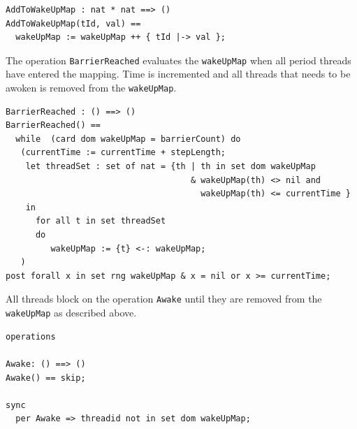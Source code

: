 \documentclass{overturerepchap}
\begin{document}
\begin{lstlisting}
AddToWakeUpMap : nat * nat ==> ()
AddToWakeUpMap(tId, val) ==
  wakeUpMap := wakeUpMap ++ { tId |-> val };
\end{lstlisting}

The operation \texttt{BarrierReached} evaluates the \texttt{wakeUpMap} when 
all period threads have entered the mapping. Time is incremented and all threads
that needs to be awoken is removed from the \texttt{wakeUpMap}.

\begin{lstlisting}
BarrierReached : () ==> ()
BarrierReached() == 
  while  (card dom wakeUpMap = barrierCount) do
   (currentTime := currentTime + stepLength;
    let threadSet : set of nat = {th | th in set dom wakeUpMap 
                                     & wakeUpMap(th) <> nil and 
                                       wakeUpMap(th) <= currentTime }
    in
      for all t in set threadSet 
      do
         wakeUpMap := {t} <-: wakeUpMap;
   )
post forall x in set rng wakeUpMap & x = nil or x >= currentTime;
\end{lstlisting}

All threads block on the operation \texttt{Awake} until they are removed from
the \texttt{wakeUpMap} as described above.

\begin{lstlisting}
operations

Awake: () ==> ()
Awake() == skip;

sync
  per Awake => threadid not in set dom wakeUpMap;
\end{lstlisting}

%

%

%
%
%
\end{document}
